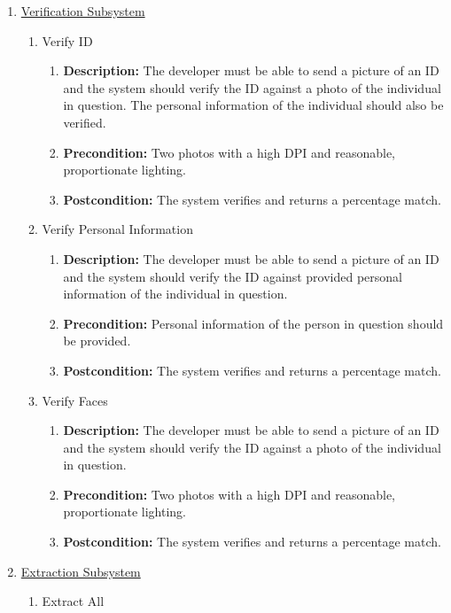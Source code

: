 \documentclass{article}
\begin{document}
		\begin{enumerate}
			\item \underline{Verification Subsystem}
			\begin{enumerate}
				\item Verify ID
				\begin{enumerate}
					\item \textbf{Description:} The developer must be able to send a picture of an ID and the system should verify the ID against a photo of the individual in question. The personal information of the individual should also be verified.
					\item \textbf{Precondition:} Two photos with a high DPI and reasonable, proportionate lighting.
					\item \textbf{Postcondition:} The system verifies and returns a percentage match.
				\end{enumerate}
				\item Verify Personal Information
				\begin{enumerate}
					\item \textbf{Description:} The developer must be able to send a picture of an ID and the system should verify the ID against provided personal information of the individual in question.
					\item \textbf{Precondition:} Personal information of the person in question should be provided.
					\item \textbf{Postcondition:} The system verifies and returns a percentage match.
				\end{enumerate}
				\item Verify Faces
				\begin{enumerate}
					\item \textbf{Description:} The developer must be able to send a picture of an ID and the system should verify the ID against a photo of the individual in question.
					\item \textbf{Precondition:} Two photos with a high DPI and reasonable, proportionate lighting.
					\item \textbf{Postcondition:} The system verifies and returns a percentage match.
				\end{enumerate}
			\end{enumerate}
			\item \underline{Extraction Subsystem}
			\begin{enumerate}
				\item Extract All
				\begin{enumerate}

\end{enumerate}
\end{enumerate}
\end{enumerate}
\end{document}
